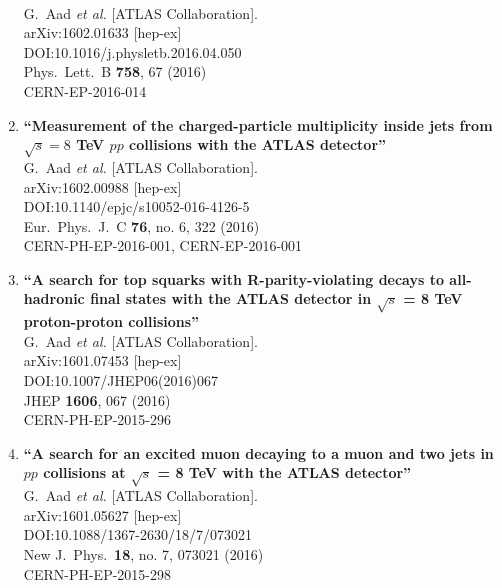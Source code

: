 \documentclass{article}
\begin{document}
\begin{enumerate}
  \\{}G.~Aad {\it et al.} [ATLAS Collaboration].
  \\{}arXiv:1602.01633 [hep-ex]
  \\{}DOI:10.1016/j.physletb.2016.04.050
  \\{}Phys.\ Lett.\ B {\bf 758}, 67 (2016)
  \\{}CERN-EP-2016-014
\item%
{\bf ``Measurement of the charged-particle multiplicity inside jets from $\sqrt{s}=8$ TeV $pp$ collisions with the ATLAS detector''}
  \\{}G.~Aad {\it et al.} [ATLAS Collaboration].
  \\{}arXiv:1602.00988 [hep-ex]
  \\{}DOI:10.1140/epjc/s10052-016-4126-5
  \\{}Eur.\ Phys.\ J.\ C {\bf 76}, no. 6, 322 (2016)
  \\{}CERN-PH-EP-2016-001, CERN-EP-2016-001
\item%
{\bf ``A search for top squarks with R-parity-violating decays to all-hadronic final states with the ATLAS detector in $\sqrt{s}$ = 8 TeV proton-proton collisions''}
  \\{}G.~Aad {\it et al.} [ATLAS Collaboration].
  \\{}arXiv:1601.07453 [hep-ex]
  \\{}DOI:10.1007/JHEP06(2016)067
  \\{}JHEP {\bf 1606}, 067 (2016)
  \\{}CERN-PH-EP-2015-296
\item%
{\bf ``A search for an excited muon decaying to a muon and two jets in $pp$ collisions at $\sqrt{s}$ = 8 TeV with the ATLAS detector''}
  \\{}G.~Aad {\it et al.} [ATLAS Collaboration].
  \\{}arXiv:1601.05627 [hep-ex]
  \\{}DOI:10.1088/1367-2630/18/7/073021
  \\{}New J.\ Phys.\  {\bf 18}, no. 7, 073021 (2016)
  \\{}CERN-PH-EP-2015-298

\end{enumerate}
\end{document}
